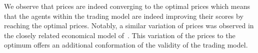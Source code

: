 \documentclass{wscpaperproc}
\newcommand{\memo}[2]{\textcolor{#1}{#2}}
\newcommand{\jm}[1]{\memo{blue}{JM: #1\\}}
\newcommand{\xrc}[1]{\memo{orange}{XRC: #1\\}}
\begin{document}
We observe that prices are indeed converging to the optimal prices which means that the agents within the trading model are indeed improving their scores by reaching the optimal prices. Notably, a similar variation of prices was observed in the closely related economical model of~\cite{gintis_emergence_2006}. This variation of the prices to the optimum offers an additional conformation of the validity of the trading model. 

%
%
%
%
\end{document}
